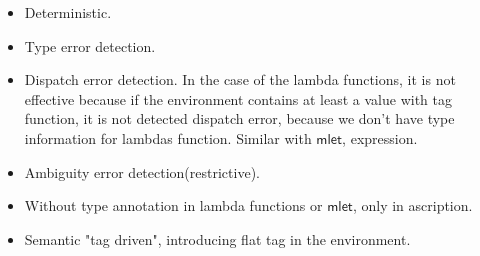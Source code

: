 \documentclass[preprint,authoryear,sort&compress,9pt,nocopyrightspace]{article}
\begin{document}
\begin{itemize}
\item Deterministic.
\item Type error  detection.
\item Dispatch error detection. In the case of the lambda functions, it is not effective because if the environment contains at least a value with tag function, it is not detected  dispatch error, because we don't have type information for lambdas function. Similar with  $\mathsf{mlet}$, expression.
\item Ambiguity error detection(restrictive).
\item Without type annotation in lambda functions or $\mathsf{mlet}$, only in ascription.
\item Semantic "tag driven", introducing flat tag in the environment.

 
\end{itemize}
\end{document}
